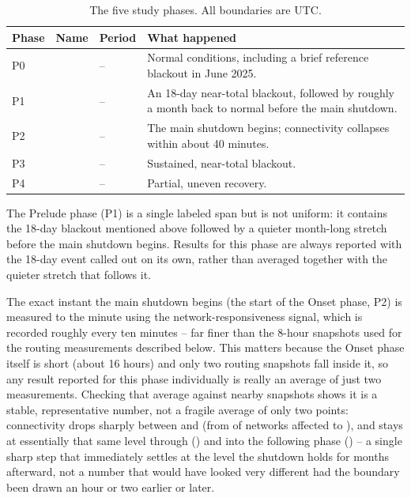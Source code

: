 \begin{table}[t]
\centering
\small
\caption{The five study phases. All boundaries are UTC.}
\label{tab:phases}
\begin{tabular}{@{}p{0.6cm} p{1.6cm} p{4.2cm} p{6.5cm}@{}}
\toprule
Phase & Name & Period & What happened \\
\midrule
P0 & \PZeroName{} & \PZeroStart{} -- \PZeroBoundary{} & Normal conditions, including a brief reference blackout in June 2025. \\[4pt]
P1 & \POneName{} & \POneStart{} -- \POneBoundary{} & An 18-day near-total blackout, followed by roughly a month back to normal before the main shutdown. \\[4pt]
P2 & \PTwoName{} & \PTwoStart{} -- \PTwoBoundary{} & The main shutdown begins; connectivity collapses within about 40 minutes. \\[4pt]
P3 & \PThreeName{} & \PThreeStart{} -- \PThreeBoundary{} & Sustained, near-total blackout. \\[4pt]
P4 & \PFourName{} & \PFourStart{} -- \PFourBoundary{} & Partial, uneven recovery. \\
\bottomrule
\end{tabular}
\end{table}

The Prelude phase (P1) is a single labeled span but is not uniform: it
contains the 18-day blackout mentioned above followed by a quieter
month-long stretch before the main shutdown begins. Results for this phase
are always reported with the 18-day event called out on its own, rather
than averaged together with the quieter stretch that follows it.

The exact instant the main shutdown begins (the start of the Onset phase,
P2) is measured to the minute using the network-responsiveness signal,
which is recorded roughly every ten minutes -- far finer than the 8-hour
snapshots used for the routing measurements described below. This matters
because the Onset phase itself is short (about 16 hours) and only two
routing snapshots fall inside it, so any result reported for this phase
individually is really an average of just two measurements. Checking that
average against nearby snapshots shows it is a stable, representative
number, not a fragile average of only two points: connectivity drops
sharply between \trajTimePrevMidnight{} and \trajTimeTransitionMorning{}
(from \trajDarkSharePrevMidnight{} of networks affected to
\trajDarkShareTransitionMorning{}), and stays at essentially that same level
through \trajTimeTransitionAfternoon{} (\trajDarkShareTransitionAfternoon{})
and into the following phase (\trajDarkShareNextMidnight{}) -- a single
sharp step that immediately settles at the level the shutdown holds for
months afterward, not a number that would have looked very different had
the boundary been drawn an hour or two earlier or later.

